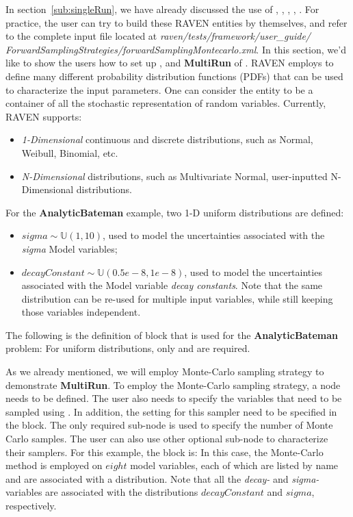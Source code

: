 In section~\ref{sub:singleRun}, we have already discussed the use of , , ,
, . For practice, the user can try to build these RAVEN entities by themselves,
and refer to the complete input file located at
\textit{raven/tests/framework/user\_guide/ ForwardSamplingStrategies/forwardSamplingMontecarlo.xml}.
In this section, we'd like to show the users how to set up ,  and \textbf{MultiRun}
of . RAVEN employs  to define many different probability distribution
functions (PDFs) that can be used to characterize the input parameters. One can consider the 
entity to be a container of all the stochastic representation of random variables. Currently, RAVEN supports:
\begin{itemize}
  \item \textit{1-Dimensional} continuous and discrete distributions, such as Normal, Weibull, Binomial, etc.
  \item \textit{N-Dimensional} distributions, such as Multivariate Normal, user-inputted N-Dimensional distributions.
\end{itemize}
For the \textbf{AnalyticBateman} example, two 1-D uniform distributions are defined:
\begin{itemize}
  \item $sigma \sim \mathbb{U}(1,10)$, used to model the uncertainties associated with the \textit{sigma} Model variables;
  \item $decayConstant \sim \mathbb{U}(0.5e-8,1e-8)$,  used to model the uncertainties associated with the Model variable
    \textit{decay constants}.  Note that the same distribution can be re-used for multiple input variables, while
    still keeping those variables independent.
\end{itemize}
The following is the definition of  block that is used for the \textbf{AnalyticBateman} problem:
For uniform distributions, only  and  are required.

As we already mentioned, we will employ Monte-Carlo sampling strategy to demonstrate \textbf{MultiRun}.
To employ the Monte-Carlo sampling strategy, a  node needs to be defined.
The user also needs to specify the variables that need to be sampled using . In addition,
the setting for this sampler need to be specified in the  block. The only required sub-node
 is used to specify the number of Monte Carlo samples. The user can also use other optional sub-node
to characterize their samplers. For this example, the  block is:
In this case, the Monte-Carlo method is employed on $eight$ model variables, each of which are listed by name and
are associated with a distribution. Note that all the \textit{decay-\*} and \textit{sigma-\*} variables are
associated with the distributions $decayConstant$ and $sigma$, respectively.

